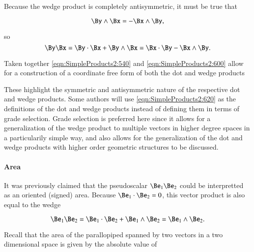 Because the wedge product is completely antisymmetric, it must be true that

\begin{dmath}\label{eqn:SimpleProducts2:580}
\By \wedge \Bx = -\Bx \wedge \By,
\end{dmath}

so
\begin{dmath}\label{eqn:SimpleProducts2:600}
\By \Bx
= \By \cdot \Bx + \By \wedge \Bx
= \Bx \cdot \By - \Bx \wedge \By.
\end{dmath}

Taken together \cref{eqn:SimpleProducts2:540} and \cref{eqn:SimpleProducts2:600} allow for a construction of a coordinate free form of both the dot and wedge products


These highlight the symmetric and antisymmetric nature of the respective dot and wedge products.  Some authors will use \cref{eqn:SimpleProducts2:620} as the definitions of the dot and wedge products instead of defining them in terms of grade selection.  Grade selection is preferred here since it allows for a generalization of the wedge product to multiple vectors in higher degree spaces in a particularily simple way, and also allows for the generalization of the dot and wedge products with higher order geometric structures to be discussed.

\paragraph{Area}

It was previously claimed that the pseudoscalar \( \Be_1 \Be_2 \) could be interpretted as an oriented (signed) area.  Because \( \Be_1 \cdot \Be_2 = 0 \), this vector product is also equal to the wedge

\begin{dmath}\label{eqn:SimpleProducts2:640}
\Be_1 \Be_2 = \Be_1 \cdot \Be_2 +
\Be_1 \wedge \Be_2
=
\Be_1 \wedge \Be_2.
\end{dmath}

Recall that the area of the parallopiped spanned by two vectors in a two dimensional space is given by the absolute value of

